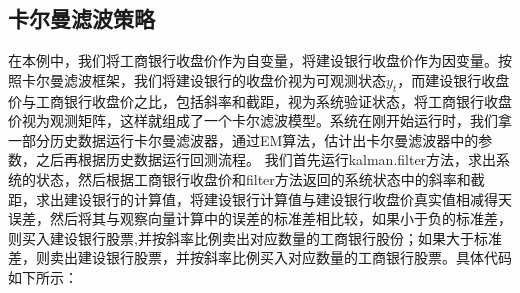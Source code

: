 \documentclass{article}
\begin{document}
\subsection{卡尔曼滤波策略}
在本例中，我们将工商银行收盘价作为自变量，将建设银行收盘价作为因变量。按照卡尔曼滤波框架，我们将建设银行的收盘价视为可观测状态$y_{t}$，而建设银行收盘价与工商银行收盘价之比，包括斜率和截距，视为系统验证状态，将工商银行收盘价视为观测矩阵，这样就组成了一个卡尔滤波模型。系统在刚开始运行时，我们拿一部分历史数据运行卡尔曼滤波器，通过EM算法，估计出卡尔曼滤波器中的参数，之后再根据历史数据运行回测流程。\newline
我们首先运行kalman.filter方法，求出系统的状态，然后根据工商银行收盘价和filter方法返回的系统状态中的斜率和截距，求出建设银行的计算值，将建设银行计算值与建设银行收盘价真实值相减得天误差，然后将其与观察向量计算中的误差的标准差相比较，如果小于负的标准差，则买入建设银行股票,并按斜率比例卖出对应数量的工商银行股份；如果大于标准差，则卖出建设银行股票，并按斜率比例买入对应数量的工商银行股票。具体代码如下所示：
\end{document}
